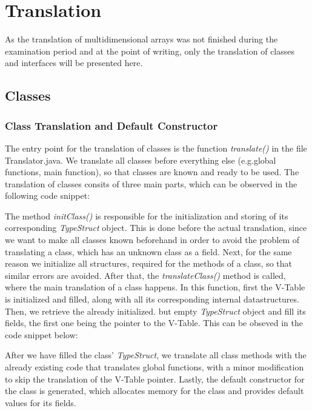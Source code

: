 \section{Translation}
\label{sec:translation}
As the translation of multidimensional arrays was not finished
during the examination period and at the point of writing,
only the translation of classes and interfaces will be presented here.

\subsection{Classes}
\subsubsection{Class Translation and Default Constructor}
\label{subsubsec:classTranslation}
The entry point for the translation of classes is the function \textit{translate()}
in the file Translator.java.
We translate all classes before everything else (e.g.\@ global functions, main function), so that
classes are known and ready to be used.  
The translation of classes consits of three main parts, which can be observed in the following code snippet:
 

The method \textit{initClass()} is responsible for the initialization and storing of
its corresponding \textit{TypeStruct} object.
This is done before the actual translation, since we want to make
all classes known beforehand in order to avoid the problem of translating 
a class, which has an unknown class as a field.
Next, for the same reason we initialize all structures, required for
the methods of a class, so that similar
errors are avoided.
After that, the \textit{translateClass()} method is called, where 
the main translation of a class happens.
In this function, first the V-Table is initialized and filled, along with all
its corresponding internal datastructures.
Then, we retrieve the already initialized. but empty \textit{TypeStruct} object
and fill its fields, the first one being the pointer to the V-Table.
This can be obseved in the code snippet below:

After we have filled the class' \textit{TypeStruct}, we translate all
class methods with the already existing code that translates global
functions, with a minor modification to skip the translation of
the V-Table pointer.
Lastly, the default constructor for the class is generated, which allocates
memory for the class and provides default values for its fields.


